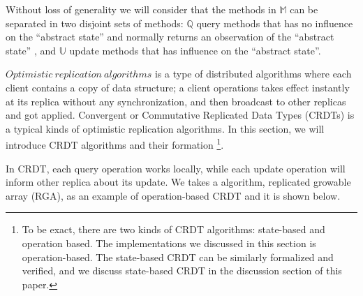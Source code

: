 

Without loss of generality we will consider that the methods in $\mathbb{M}$ can be separated in two disjoint sets of methods: $\mathbb{Q}$ query methods that has no influence on the ``abstract state'' and normally returns an observation of the ``abstract state'' , and $\mathbb{U}$ update methods that has influence on the ``abstract state''. %

$\mathit{Optimistic \ replication \ algorithms}$ is a type of distributed algorithms where each client contains a copy of data structure; a client operations takes effect instantly at its replica without any synchronization, and then broadcast to other replicas and got applied. Convergent or Commutative Replicated Data Types (CRDTs) is a typical kinds of optimistic replication algorithms. In this section, we will introduce CRDT algorithms and their formation \footnote{To be exact, there are two kinds of CRDT algorithms: state-based and operation based. The implementations we discussed in this section is operation-based. The state-based CRDT can be similarly formalized and verified, and we discuss state-based CRDT in the discussion section of this paper.}.

In CRDT, each query operation works locally, while each update operation will inform other replica about its update. We takes a algorithm, replicated growable array (RGA), as an example of operation-based CRDT and it is shown below.


